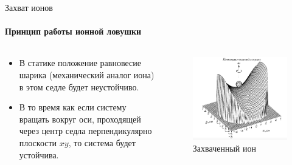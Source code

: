\documentclass{beamer}
\begin{document}
    \begin{frame}{Захват ионов}
    \framesubtitle{Принцип работы ионной ловушки}

        \begin{columns}

        \begin{column}{0.5\textwidth}

            \begin{itemize}
                \item<2-> В статике положение равновесие шарика (механический аналог иона) в этом седле будет неустойчиво.
                \item<2-> В то время как если систему вращать вокруг оси, проходящей через центр седла перпендикулярно плоскости $xy$, то система
                будет устойчива.
            \end{itemize}

        \end{column}

        \begin{column}{0.5\textwidth}
            \begin{figure}
                \centering
                \includegraphics[width=\textwidth]{media/trap-potential.png}
                \caption{Захваченный ион}
            \end{figure}
        \end{column}

        \end{columns}

        \end{frame}
\end{document}
